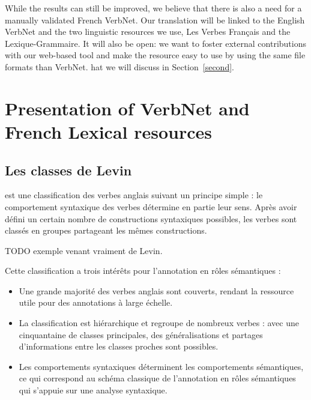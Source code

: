While the results can still be improved, we believe that there is also a need
for a manually validated French VerbNet.  Our translation will be linked to the
English VerbNet and the two linguistic resources we use, Les Verbes Français
and the Lexique-Grammaire. It will also be open: we want to foster external
contributions with our web-based tool and make the resource easy to use by
using the same file formats than VerbNet.  hat we will discuss in
Section~\ref{second}.

\section{Presentation of VerbNet and French Lexical resources}\label{french}

\subsection{Les classes de Levin}

\cite{levin1993english} est une classification des verbes anglais suivant un
principe simple : le comportement syntaxique des verbes détermine en partie
leur sens. Après avoir défini un certain nombre de constructions syntaxiques
possibles, les verbes sont classés en groupes partageant les mêmes
constructions.

TODO exemple venant vraiment de Levin.

Cette classification a trois intérêts pour l'annotation en rôles sémantiques :

\begin{itemize}

    \item Une grande majorité des verbes anglais sont couverts, rendant la
        ressource utile pour des annotations à large échelle.

    \item La classification est hiérarchique et regroupe de nombreux verbes :
        avec une cinquantaine de classes principales, des généralisations et
        partages d'informations entre les classes proches sont possibles.

    \item Les comportements syntaxiques déterminent les comportements
        sémantiques, ce qui correspond au schéma classique de l'annotation en
        rôles sémantiques qui s'appuie sur une analyse syntaxique.

\end{itemize}


